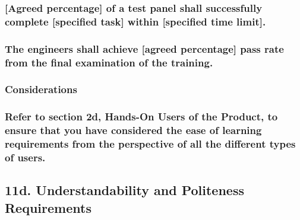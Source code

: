 \documentclass[
]{article}
\begin{document}
\hypertarget{agreed-percentage-of-a-test-panel-shall-successfully-complete-specified-task-within-specified-time-limit.}{%
\subsubsection{{[}Agreed percentage{]} of a test panel shall
successfully complete {[}specified task{]} within {[}specified time
limit{]}.}\label{agreed-percentage-of-a-test-panel-shall-successfully-complete-specified-task-within-specified-time-limit.}}

\hypertarget{the-engineers-shall-achieve-agreed-percentage-pass-rate-from-the-final-examination-of-the-training.}{%
\subsubsection{The engineers shall achieve {[}agreed percentage{]} pass
rate from the final examination of the
training.}\label{the-engineers-shall-achieve-agreed-percentage-pass-rate-from-the-final-examination-of-the-training.}}

\hypertarget{considerations-22}{%
\subsubsection{Considerations}\label{considerations-22}}

\hypertarget{refer-to-section-2d-hands-on-users-of-the-product-to-ensure-that-you-have-considered-the-ease-of-learning-requirements-from-the-perspective-of-all-the-different-types-of-users.}{%
\subsubsection{\texorpdfstring{Refer to section 2d, Hands-On Users of
the Product, to ensure that you have considered the ease of learning
requirements from the perspective of all the different types of users.
}{Refer to section 2d, Hands-On Users of the Product, to ensure that you have considered the ease of learning requirements from the perspective of all the different types of users. }}\label{refer-to-section-2d-hands-on-users-of-the-product-to-ensure-that-you-have-considered-the-ease-of-learning-requirements-from-the-perspective-of-all-the-different-types-of-users.}}

\hypertarget{d.-understandability-and-politeness-requirements}{%
\subsection{11d. Understandability and Politeness
Requirements}\label{d.-understandability-and-politeness-requirements}}
\end{document}

